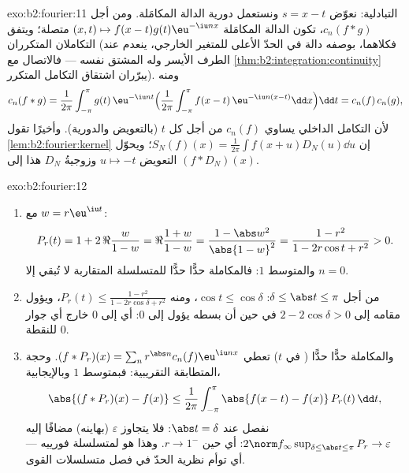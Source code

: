 \begin{solution}{exo:b2:fourier:11}
التبادلية: نعوّض $s = x - t$ ونستعمل دورية
الدالة المكامَلة. ومن أجل $c_n(f * g)$، تكون الدالة المكامَلة $(x, t) \mapsto
f(x-t)g(t)\eu^{-\iu nx}$ متصلة؛ ويتفق التكاملان
المتكرران (فكلاهما، بوصفه دالة في الحدّ الأعلى للمتغير
الخارجي، ينعدم عند الطرف الأيسر وله المشتق نفسه ---
فالاتصال مع
\cref{thm:b2:integration:continuity} يبرّران اشتقاق
التكامل المتكرر). ومنه
\[
c_n(f*g) = \frac{1}{2\pi}\int_{-\pi}^{\pi} g(t)\,\eu^{-\iu nt}
\Bigl(\frac{1}{2\pi}\int_{-\pi}^{\pi}
f(x-t)\,\eu^{-\iu n(x-t)}\dd x\Bigr)\dd t
= c_n(f)\,c_n(g),
\]
لأن التكامل الداخلي يساوي $c_n(f)$ من أجل كل $t$ (بالتعويض
والدورية). وأخيرًا تقول \cref{lem:b2:fourier:kernel} إن
$S_N(f)(x) = \frac{1}{2\pi}\int f(x+u)D_N(u)\dd u$؛ ويحوّل
التعويض $u \mapsto -t$ وزوجيةُ $D_N$ هذا
إلى $(f * D_N)(x)$.
\end{solution}

\begin{solution}{exo:b2:fourier:12}
\begin{enumerate}
  \item مع $w = r\eu^{\iu t}$:
        \[
        P_r(t) = 1 + 2\,\Re\frac{w}{1 - w}
        = \Re\frac{1 + w}{1 - w}
        = \frac{1 - \abs w^2}{\abs{1 - w}^2}
        = \frac{1 - r^2}{1 - 2r\cos t + r^2} > 0 .
        \]
        والمتوسط $1$: فالمكاملة حدًّا حدًّا للمتسلسلة المتقاربة
         لا تُبقي إلا $n = 0$.
  \item من أجل $\delta \leq \abs t \leq \pi$: $\cos t \leq
        \cos\delta$، ومنه $P_r(t) \leq \frac{1 - r^2}{1 -
        2r\cos\delta + r^2}$، ويؤول مقامه إلى $2 -
        2\cos\delta > 0$ في حين أن بسطه يؤول إلى $0$:
        أي  إلى $0$ خارج أي جوار للنقطة
        $0$.
  \item والمكاملة حدًّا حدًّا ( في $t$)
        تعطي $(f * P_r)(x) = \sum_n r^{\abs
        n}c_n(f)\eu^{\iu nx}$. وحجة المتطابقة التقريبية:
        فبمتوسط $1$ وبالإيجابية،
        \[
        \abs{(f*P_r)(x) - f(x)}
        \leq \frac{1}{2\pi}\int_{-\pi}^{\pi}
        \abs{f(x-t) - f(x)}\,P_r(t)\,\dd t ,
        \]
        نفصل عند $\abs t = \delta$: فلا يتجاوز $\varepsilon$
        (بهاينه) مضافًا إليه $2\norm f_\infty\sup_{\delta\leq\abs
        t\leq\pi}P_r \to \varepsilon$: أي  حين
        $r \to 1^-$. وهذا هو  لمتسلسلة
        فورييه --- أي توأم نظرية الحدّ في فصل متسلسلات
        القوى.
\end{enumerate}
\end{solution}

